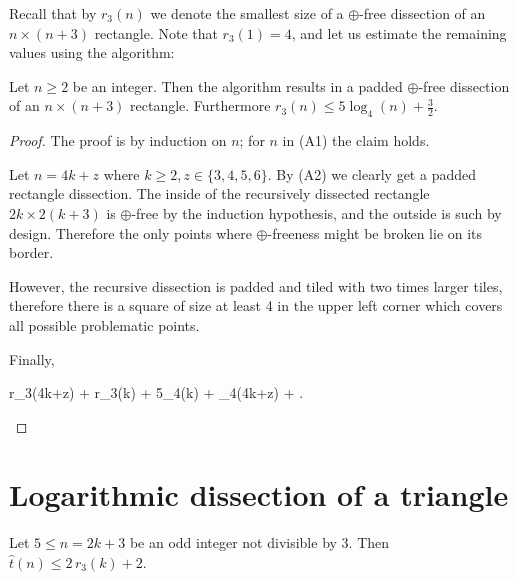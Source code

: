 Recall that by $r_3(n)$ we denote the smallest size of a $\oplus$-free dissection of an $n \times (n+3)$ rectangle. Note that $r_3(1) = 4$, and let us estimate the remaining values using the algorithm:

\begin{lem}
\label{lem:r3n}
Let $n \geq 2$ be an integer. Then the algorithm results in a padded $\oplus$-free dissection of an $n \times (n+3)$ rectangle. Furthermore $r_3(n) \leq 5\log_4(n)+\frac{3}{2}$.
\end{lem}
\begin{proof}
The proof is by induction on $n$; for $n$ in (A1) the claim holds.

Let $n = 4k+z$ where $k \geq 2, z \in \{3,4,5,6\}$. By (A2) we clearly get a padded rectangle dissection. The inside of the recursively dissected rectangle $2k \times 2(k+3)$ is $\oplus$-free by the induction hypothesis, and the outside is such by design. Therefore the only points where $\oplus$-freeness might be broken lie on its border.

However, the recursive dissection is padded and tiled with two times larger tiles, therefore there is a square of size at least 4 in the upper left corner which covers all possible problematic points.

Finally,
\begin{cosyeqnarray}
	r_3(4k+z)  + r_3(k)  + 5\log_4(k) +   \log_4(4k+z) + .
\end{cosyeqnarray}%
\end{proof}

\section{Logarithmic dissection of a triangle}

\begin{lem}
\label{lem:triangles-to-squares}
Let $5 \leq n = 2k+3$ be an odd integer not divisible by 3. Then $\hat t(n) \leq 2\,r_3(k)+2$.
\end{lem}

